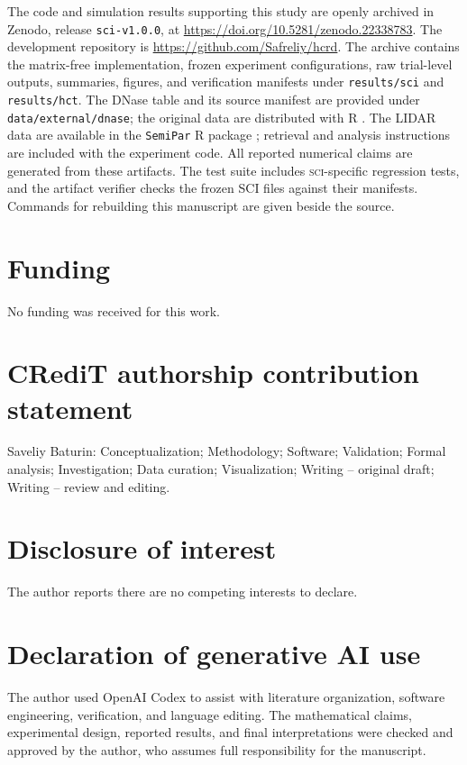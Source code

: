 \documentclass{interact}
\theoremstyle{definition}
\theoremstyle{remark}
\newcommand{\SCI}{\textnormal{\textsc{sci}}\xspace}
\begin{document}
The code and simulation results supporting this study are openly archived in
Zenodo, release \texttt{sci-v1.0.0}, at
\url{https://doi.org/10.5281/zenodo.22338783}.  The development repository is
\url{https://github.com/Safreliy/hcrd}.  The archive contains the
matrix-free implementation, frozen
experiment configurations, raw trial-level outputs, summaries, figures, and
verification manifests under \texttt{results/sci} and \texttt{results/hct}.
The DNase table and its source manifest are provided under
\texttt{data/external/dnase}; the original data are distributed with R
\citep{r2025}.  The LIDAR data are available in the \texttt{SemiPar} R package
\citep{ruppert2003semiparametric}; retrieval and analysis instructions are
included with the experiment code.  All reported numerical claims are generated from
these artifacts.  The test suite includes \SCI-specific regression tests, and
the artifact verifier checks the frozen SCI files against their manifests.
Commands for rebuilding this manuscript are given beside the source.

\section*{Funding}

No funding was received for this work.

\section*{CRediT authorship contribution statement}

Saveliy Baturin: Conceptualization; Methodology; Software; Validation; Formal
analysis; Investigation; Data curation; Visualization; Writing -- original
draft; Writing -- review and editing.

\section*{Disclosure of interest}

The author reports there are no competing interests to declare.

\section*{Declaration of generative AI use}

The author used OpenAI Codex to assist with literature organization, software
engineering, verification, and language editing.  The mathematical claims,
experimental design, reported results, and final interpretations were checked
and approved by the author, who assumes full responsibility for the manuscript.
\end{document}
